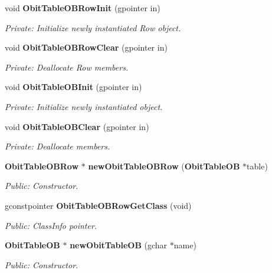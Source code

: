 \begin{CompactItemize}
\item 
void {\bf Obit\-Table\-OBRow\-Init} (gpointer in)
\begin{CompactList}\small\item\em Private: Initialize newly instantiated Row object. \item\end{CompactList}\item 
void {\bf Obit\-Table\-OBRow\-Clear} (gpointer in)
\begin{CompactList}\small\item\em Private: Deallocate Row members. \item\end{CompactList}\item 
void {\bf Obit\-Table\-OBInit} (gpointer in)
\begin{CompactList}\small\item\em Private: Initialize newly instantiated object. \item\end{CompactList}\item 
void {\bf Obit\-Table\-OBClear} (gpointer in)
\begin{CompactList}\small\item\em Private: Deallocate members. \item\end{CompactList}\item 
{\bf Obit\-Table\-OBRow} $\ast$ {\bf new\-Obit\-Table\-OBRow} ({\bf Obit\-Table\-OB} $\ast$table)
\begin{CompactList}\small\item\em Public: Constructor. \item\end{CompactList}\item 
gconstpointer {\bf Obit\-Table\-OBRow\-Get\-Class} (void)
\begin{CompactList}\small\item\em Public: Class\-Info pointer. \item\end{CompactList}\item 
{\bf Obit\-Table\-OB} $\ast$ {\bf new\-Obit\-Table\-OB} (gchar $\ast$name)
\begin{CompactList}\small\item\em Public: Constructor. \item\end{CompactList}\item 

\end{CompactItemize}
